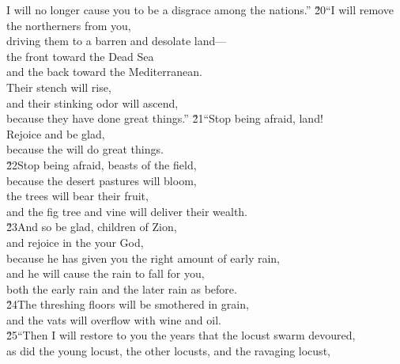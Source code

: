 \begin{poetry}
\poeml I will no longer cause you to be a disgrace among the nations.''
\poeml \v{20}``I will remove the northerners from you, \\
\poemll    driving them to a barren and desolate land--- \\
\poeml the front toward the Dead Sea \\
\poemll    and the back toward the Mediterranean. \\
\poeml Their stench will rise, \\
\poemll    and their stinking odor will ascend, \\
\poemlll       because they have done great things.''
\poeml \v{21}``Stop being afraid, land! \\
\poemll    Rejoice and be glad, \\
\poemlll       because the  will do great things. \\
\poeml \v{22}Stop being afraid, beasts of the field, \\
\poemll    because the desert pastures will bloom, \\
\poeml the trees will bear their fruit, \\
\poemll    and the fig tree and vine will deliver their wealth. \\
\poeml \v{23}And so be glad, children of Zion, \\
\poemll    and rejoice in the  your God, \\
\poeml because he has given you the right amount of early rain, \\
\poemll    and he will cause the rain to fall for you, \\
\poemlll       both the early rain and the later rain as before. \\
\poeml \v{24}The threshing floors will be smothered in grain, \\
\poemll    and the vats will overflow with wine and oil. \\
\poeml \v{25}``Then I will restore to you the years that the locust swarm devoured, \\
\poemll    as did the young locust, the other locusts, and the ravaging locust, \\

\end{poetry}
